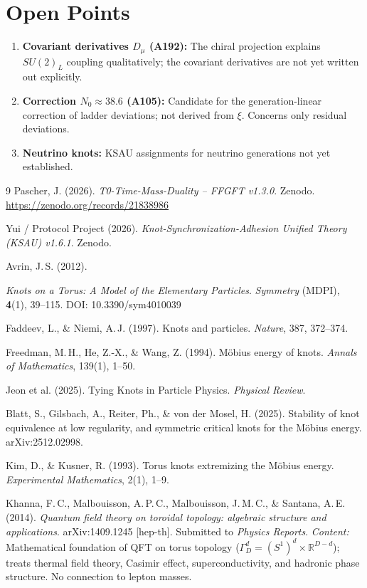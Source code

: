 \section{Open Points}

\begin{enumerate}
  \item \textbf{Covariant derivatives $D_\mu$ (A192):} The chiral
    projection explains $SU(2)_L$ coupling qualitatively; the
    covariant derivatives are not yet written out explicitly.
  \item \textbf{Correction $N_0 \approx 38.6$ (A105):} Candidate for
    the generation-linear correction of ladder deviations; not derived
    from $\xi$. Concerns only residual deviations.
  \item \textbf{Neutrino knots:} KSAU assignments for neutrino
    generations not yet established.
\end{enumerate}

\begin{thebibliography}{9}
Pascher, J. (2026). \emph{T0-Time-Mass-Duality -- FFGFT v1.3.0}.
Zenodo. \url{https://zenodo.org/records/21838986}

Yui / Protocol Project (2026).
\emph{Knot-Synchronization-Adhesion Unified Theory (KSAU) v1.6.1}.
Zenodo.

Avrin, J.\,S. (2012).

\emph{Knots on a Torus: A Model of the Elementary Particles}.
\emph{Symmetry} (MDPI), \textbf{4}(1), 39--115.
DOI: 10.3390/sym4010039

Faddeev, L., \& Niemi, A.\,J. (1997). Knots and particles.
\emph{Nature}, 387, 372--374.

Freedman, M.\,H., He, Z.-X., \& Wang, Z. (1994).
Möbius energy of knots.
\emph{Annals of Mathematics}, 139(1), 1--50.

Jeon et al. (2025). Tying Knots in Particle Physics.
\emph{Physical Review}.

Blatt, S., Gilsbach, A., Reiter, Ph., \& von der Mosel, H. (2025).
Stability of knot equivalence at low regularity, and symmetric critical
knots for the M\"obius energy.
arXiv:2512.02998.

Kim, D., \& Kusner, R. (1993).
Torus knots extremizing the M\"obius energy.
\emph{Experimental Mathematics}, 2(1), 1--9.

Khanna, F.\,C., Malbouisson, A.\,P.\,C., Malbouisson, J.\,M.\,C., \& Santana, A.\,E. (2014).
\emph{Quantum field theory on toroidal topology: algebraic structure and applications}.
arXiv:1409.1245 [hep-th]. Submitted to \emph{Physics Reports}.
\emph{Content:} Mathematical foundation of QFT on torus topology ($\Gamma^d_D = (S^1)^d \times \mathbb{R}^{D-d}$); treats thermal field theory, Casimir effect, superconductivity, and hadronic phase structure. No connection to lepton masses.

\end{thebibliography}
